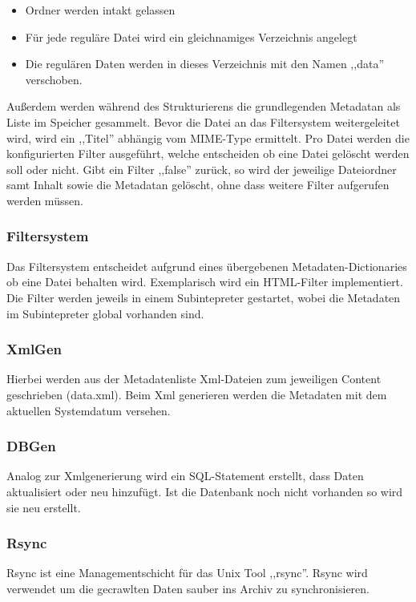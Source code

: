 \begin{itemize}
    \item Ordner werden intakt gelassen
    \item Für jede reguläre Datei wird ein gleichnamiges Verzeichnis angelegt
    \item Die regulären Daten werden in dieses Verzeichnis mit den Namen ,,data'' verschoben.
\end{itemize}

Außerdem werden während des Strukturierens die grundlegenden Metadatan als Liste im Speicher gesammelt.
Bevor die Datei an das Filtersystem weitergeleitet wird, wird ein ,,Titel'' abhängig vom MIME-Type ermittelt.
Pro Datei werden die konfigurierten Filter ausgeführt, welche entscheiden ob eine Datei gelöscht werden soll oder nicht.
Gibt ein Filter ,,false'' zurück, so wird der jeweilige Dateiordner samt Inhalt sowie die Metadatan gelöscht,
ohne dass weitere Filter aufgerufen werden müssen.

\subsubsection{Filtersystem}
\label{ssub:filtersystem}
Das Filtersystem entscheidet aufgrund eines übergebenen Metadaten-Dictionaries ob eine Datei behalten wird. Exemplarisch wird ein HTML-Filter
implementiert. Die Filter werden jeweils in einem Subintepreter gestartet, wobei die Metadaten im Subintepreter global vorhanden sind.


\subsubsection{XmlGen}
\label{ssub:xmlgen}
Hierbei werden aus der Metadatenliste Xml-Dateien zum jeweiligen Content geschrieben (data.xml). 
Beim Xml generieren werden die Metadaten mit dem aktuellen Systemdatum versehen.


\subsubsection{DBGen}
\label{ssub:dbgen}
Analog zur Xmlgenerierung wird ein SQL-Statement erstellt, dass Daten aktualisiert oder neu hinzufügt.
Ist die Datenbank noch nicht vorhanden so wird sie neu erstellt.


\subsubsection{Rsync}
\label{ssub:rsync}
Rsync ist eine Managementschicht für das Unix Tool ,,rsync''. Rsync wird verwendet um die gecrawlten Daten sauber ins Archiv zu synchronisieren.


